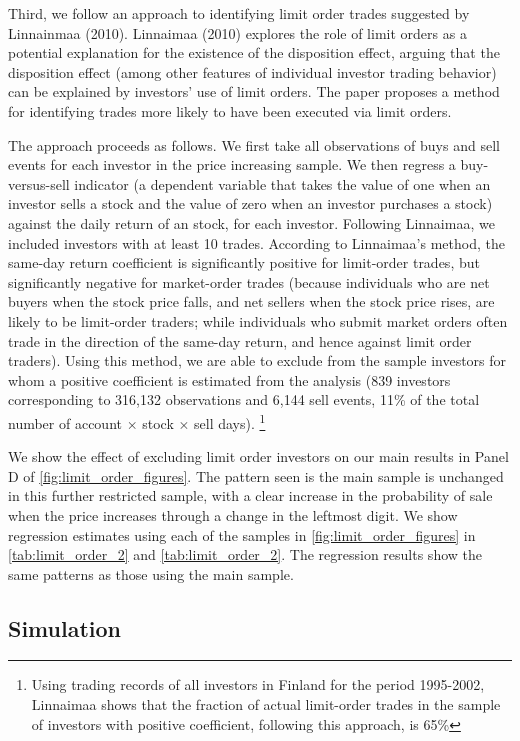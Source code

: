 Third, we follow an approach to identifying limit order trades suggested by  Linnainmaa (2010). Linnaimaa (2010) explores the role of limit orders as a potential explanation for the existence of the disposition effect, arguing that the disposition effect (among other features of individual investor trading behavior) can be explained by investors' use of limit orders. The paper proposes a method for identifying trades more likely to have been executed via limit orders.  

The approach proceeds as follows. We first take all observations of buys and sell events for each investor in the price increasing sample. We then regress a buy-versus-sell indicator (a dependent variable that takes the value of one when an investor sells a stock and the value of zero when an investor purchases a stock) against the daily return of an stock, for each investor. Following Linnaimaa, we included investors with at least 10 trades. According to Linnaimaa's method, the same-day return coefficient is significantly positive for limit-order trades, but significantly negative for market-order trades (because individuals who are net buyers when the stock price falls, and net sellers when the stock price rises, are likely to be limit-order traders; while individuals who submit market orders often trade in the direction of the same-day return, and hence against limit order traders). Using this method, we are able to exclude from the sample investors for whom a positive coefficient is estimated from the analysis (839 investors corresponding to 316,132 observations and 6,144 sell events, 11\% of the total number of account $\times$ stock $\times$ sell days).
\footnote{Using trading records of all investors in Finland for the period 1995-2002, Linnaimaa shows that the fraction of actual limit-order trades in the sample of investors with positive coefficient, following this approach, is 65\%}

We show the effect of excluding limit order investors on our main results in Panel D of \ref{fig:limit_order_figures}. The pattern seen is the main sample is unchanged in this further restricted sample, with a clear increase in the probability of sale when the price increases through a change in the leftmost digit. We show regression estimates using each of the samples in \ref{fig:limit_order_figures} in \ref{tab:limit_order_2} and  \ref{tab:limit_order_2}. The regression results show the same patterns as those using the main sample.

\subsection{Simulation}

